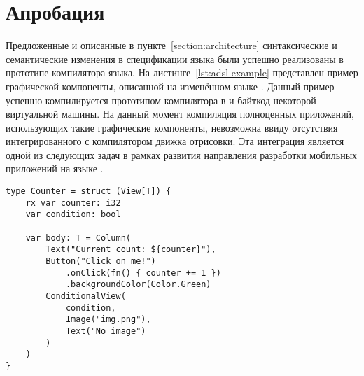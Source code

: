 \section{Апробация}
Предложенные и описанные в пункте~\ref{section:architecture}
синтаксические и семантические изменения в спецификации языка 
были успешно реализованы в прототипе компилятора языка. На
листинге~\ref{lst:adsl-example} представлен пример графической компоненты,
описанной на изменённом языке . Данный пример успешно
компилируется прототипом компилятора в  и байткод некоторой
виртуальной машины. На данный момент компиляция полноценных приложений,
использующих такие графические компоненты, невозможна ввиду отсутствия
интегрированного с компилятором движка отрисовки. Эта интеграция является
одной из следующих задач в рамках развития направления разработки
мобильных приложений на языке .
\begin{lstlisting}[language=my_pseudo, caption=Пример графической компоненты на языке \name{Accord}, label={lst:adsl-example}]
type Counter = struct (View[T]) {
    rx var counter: i32
    var condition: bool
    
    var body: T = Column(
        Text("Current count: ${counter}"),
        Button("Click on me!")
            .onClick(fn() { counter += 1 })
            .backgroundColor(Color.Green)
        ConditionalView(
            condition,
            Image("img.png"),
            Text("No image")
        )
    )
}
\end{lstlisting}
